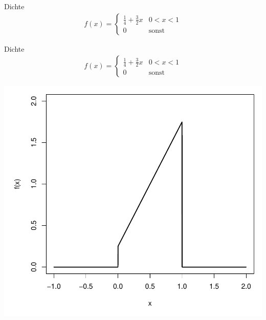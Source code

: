 \documentclass[t,11pt]{beamer}
\begin{document}
\begin{frame}
	\begin{block}{Dichte}
		\vspace{-0.5cm}
		\begin{align*}
		f(x)=\begin{cases}
		\frac{1}{4}+\frac{3}{2} x & 0<x<1\\
		0 & \text{sonst}
		\end{cases}
		\end{align*}
	\end{block}
\end{frame}

\begin{frame}
\begin{block}{Dichte}
	\vspace{-0.5cm}
	\begin{align*}
	f(x)=\begin{cases}
	\frac{1}{4}+\frac{3}{2} x & 0<x<1\\
	0 & \text{sonst}
	\end{cases}
	\end{align*}
\end{block}
\begin{center}
	\includegraphics[scale=0.45]{f.pdf}
\end{center}
\end{frame}
\end{document}

